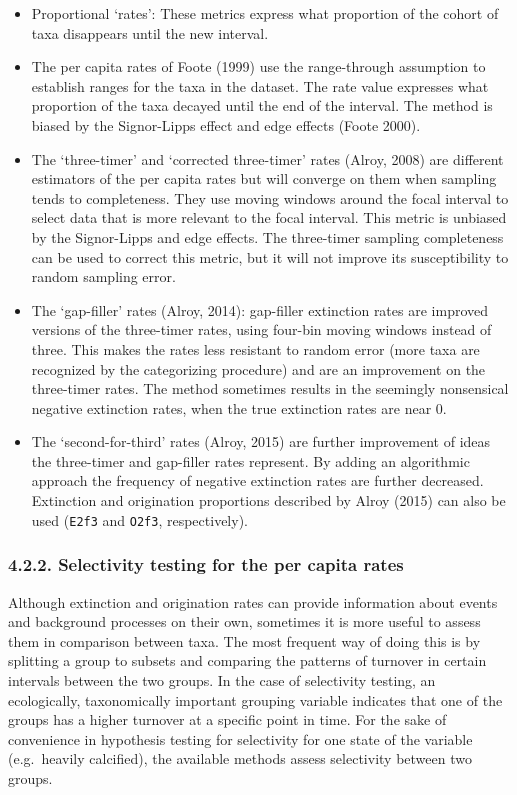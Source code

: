\documentclass[]{article}
\begin{document}
\begin{itemize}
\item
  Proportional `rates': These metrics express what proportion of the
  cohort of taxa disappears until the new interval.
\item
  The per capita rates of Foote (1999) use the range-through assumption
  to establish ranges for the taxa in the dataset. The rate value
  expresses what proportion of the taxa decayed until the end of the
  interval. The method is biased by the Signor-Lipps effect and edge
  effects (Foote 2000).
\item
  The `three-timer' and `corrected three-timer' rates (Alroy, 2008) are
  different estimators of the per capita rates but will converge on them
  when sampling tends to completeness. They use moving windows around
  the focal interval to select data that is more relevant to the focal
  interval. This metric is unbiased by the Signor-Lipps and edge
  effects. The three-timer sampling completeness can be used to correct
  this metric, but it will not improve its susceptibility to random
  sampling error.
\item
  The `gap-filler' rates (Alroy, 2014): gap-filler extinction rates are
  improved versions of the three-timer rates, using four-bin moving
  windows instead of three. This makes the rates less resistant to
  random error (more taxa are recognized by the categorizing procedure)
  and are an improvement on the three-timer rates. The method sometimes
  results in the seemingly nonsensical negative extinction rates, when
  the true extinction rates are near 0.
\item
  The `second-for-third' rates (Alroy, 2015) are further improvement of
  ideas the three-timer and gap-filler rates represent. By adding an
  algorithmic approach the frequency of negative extinction rates are
  further decreased. Extinction and origination proportions described by
  Alroy (2015) can also be used (\texttt{E2f3} and \texttt{O2f3},
  respectively).
\end{itemize}

\subsubsection{4.2.2. Selectivity testing for the per capita
rates}\label{selectivity-testing-for-the-per-capita-rates}

Although extinction and origination rates can provide information about
events and background processes on their own, sometimes it is more
useful to assess them in comparison between taxa. The most frequent way
of doing this is by splitting a group to subsets and comparing the
patterns of turnover in certain intervals between the two groups. In the
case of selectivity testing, an ecologically, taxonomically important
grouping variable indicates that one of the groups has a higher turnover
at a specific point in time. For the sake of convenience in hypothesis
testing for selectivity for one state of the variable (e.g.~heavily
calcified), the available methods assess selectivity between two groups.
\end{document}
